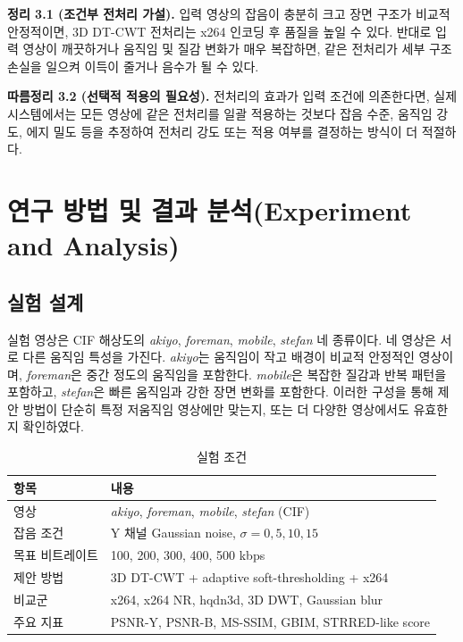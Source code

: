 \documentclass[10pt]{article}
\begin{document}
\noindent\textbf{정리 3.1 (조건부 전처리 가설).}
입력 영상의 잡음이 충분히 크고 장면 구조가 비교적 안정적이면, 3D DT-CWT 전처리는 x264 인코딩 후 품질을 높일 수 있다. 반대로 입력 영상이 깨끗하거나 움직임 및 질감 변화가 매우 복잡하면, 같은 전처리가 세부 구조 손실을 일으켜 이득이 줄거나 음수가 될 수 있다.

\noindent\textbf{따름정리 3.2 (선택적 적용의 필요성).}
전처리의 효과가 입력 조건에 의존한다면, 실제 시스템에서는 모든 영상에 같은 전처리를 일괄 적용하는 것보다 잡음 수준, 움직임 강도, 에지 밀도 등을 추정하여 전처리 강도 또는 적용 여부를 결정하는 방식이 더 적절하다.

\section{\large \bf 연구 방법 및 결과 분석(Experiment and Analysis)}
\subsection{실험 설계}
실험 영상은 CIF 해상도의 \textit{akiyo}, \textit{foreman}, \textit{mobile}, \textit{stefan} 네 종류이다. 네 영상은 서로 다른 움직임 특성을 가진다. \textit{akiyo}는 움직임이 작고 배경이 비교적 안정적인 영상이며, \textit{foreman}은 중간 정도의 움직임을 포함한다. \textit{mobile}은 복잡한 질감과 반복 패턴을 포함하고, \textit{stefan}은 빠른 움직임과 강한 장면 변화를 포함한다. 이러한 구성을 통해 제안 방법이 단순히 특정 저움직임 영상에만 맞는지, 또는 더 다양한 영상에서도 유효한지 확인하였다.

\begin{table}[hbtp]
\centering
\caption{실험 조건}
\label{tab:setup}
\begin{tabular}{ll}
\toprule
항목 & 내용 \\
\midrule
영상 & \textit{akiyo}, \textit{foreman}, \textit{mobile}, \textit{stefan} (CIF) \\
잡음 조건 & Y 채널 Gaussian noise, $\sigma=0,5,10,15$ \\
목표 비트레이트 & 100, 200, 300, 400, 500 kbps \\
제안 방법 & 3D DT-CWT + adaptive soft-thresholding + x264 \\
비교군 & x264, x264 NR, hqdn3d, 3D DWT, Gaussian blur \\
주요 지표 & PSNR-Y, PSNR-B, MS-SSIM, GBIM, STRRED-like score \\
\bottomrule
\end{tabular}
\end{table}
\end{document}
